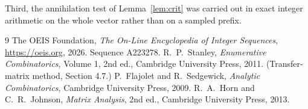 \documentclass[11pt,a4paper]{article}
\theoremstyle{plain}
\theoremstyle{definition}
\begin{document}
Third, the annihilation test of Lemma~\ref{lem:crit} was carried out in exact integer
arithmetic on the whole vector rather than on a sampled prefix.

\begin{thebibliography}{9}
 The OEIS Foundation, \emph{The On-Line Encyclopedia of Integer
Sequences}, \url{https://oeis.org}, 2026. Sequence A223278.
 R.~P.~Stanley, \emph{Enumerative Combinatorics}, Volume 1, 2nd ed.,
Cambridge University Press, 2011. (Transfer-matrix method, Section 4.7.)
 P.~Flajolet and R.~Sedgewick, \emph{Analytic Combinatorics}, Cambridge
University Press, 2009.
 R.~A.~Horn and C.~R.~Johnson, \emph{Matrix Analysis}, 2nd ed., Cambridge
University Press, 2013.
\end{thebibliography}
\end{document}
